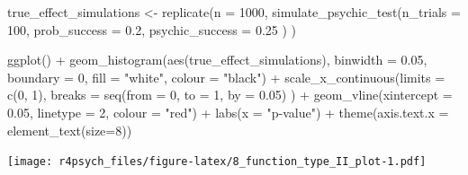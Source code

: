 \documentclass[
]{book}
\newenvironment{Shaded}{\begin{snugshade}}{\end{snugshade}}
\newcommand{\AttributeTok}[1]{\textcolor[rgb]{0.77,0.63,0.00}{#1}}
\newcommand{\DecValTok}[1]{\textcolor[rgb]{0.00,0.00,0.81}{#1}}
\newcommand{\FloatTok}[1]{\textcolor[rgb]{0.00,0.00,0.81}{#1}}
\newcommand{\FunctionTok}[1]{\textcolor[rgb]{0.00,0.00,0.00}{#1}}
\newcommand{\NormalTok}[1]{#1}
\newcommand{\OtherTok}[1]{\textcolor[rgb]{0.56,0.35,0.01}{#1}}
\newcommand{\SpecialCharTok}[1]{\textcolor[rgb]{0.00,0.00,0.00}{#1}}
\newcommand{\StringTok}[1]{\textcolor[rgb]{0.31,0.60,0.02}{#1}}
\begin{document}
\begin{Shaded}
\begin{Highlighting}[]
\NormalTok{true\_effect\_simulations }\OtherTok{\textless{}{-}} \FunctionTok{replicate}\NormalTok{(}\AttributeTok{n =} \DecValTok{1000}\NormalTok{, }
                         \FunctionTok{simulate\_psychic\_test}\NormalTok{(}\AttributeTok{n\_trials =} \DecValTok{100}\NormalTok{, }
                                               \AttributeTok{prob\_success =} \FloatTok{0.2}\NormalTok{,}
                                               \AttributeTok{psychic\_success =} \FloatTok{0.25}
\NormalTok{                                               )}
\NormalTok{                         )}
\end{Highlighting}
\end{Shaded}

\begin{Shaded}
\begin{Highlighting}[]
\FunctionTok{ggplot}\NormalTok{() }\SpecialCharTok{+} 
  \FunctionTok{geom\_histogram}\NormalTok{(}\FunctionTok{aes}\NormalTok{(true\_effect\_simulations),}
                 \AttributeTok{binwidth =} \FloatTok{0.05}\NormalTok{,}
                 \AttributeTok{boundary =} \DecValTok{0}\NormalTok{,}
                 \AttributeTok{fill =} \StringTok{"white"}\NormalTok{,}
                 \AttributeTok{colour =} \StringTok{"black"}\NormalTok{) }\SpecialCharTok{+}
  \FunctionTok{scale\_x\_continuous}\NormalTok{(}\AttributeTok{limits =} \FunctionTok{c}\NormalTok{(}\DecValTok{0}\NormalTok{, }\DecValTok{1}\NormalTok{), }
                     \AttributeTok{breaks =} \FunctionTok{seq}\NormalTok{(}\AttributeTok{from =} \DecValTok{0}\NormalTok{, }\AttributeTok{to =} \DecValTok{1}\NormalTok{, }\AttributeTok{by =} \FloatTok{0.05}\NormalTok{)}
\NormalTok{                     ) }\SpecialCharTok{+}
  \FunctionTok{geom\_vline}\NormalTok{(}\AttributeTok{xintercept =} \FloatTok{0.05}\NormalTok{, }\AttributeTok{linetype =} \DecValTok{2}\NormalTok{, }\AttributeTok{colour =} \StringTok{"red"}\NormalTok{) }\SpecialCharTok{+}
  \FunctionTok{labs}\NormalTok{(}\AttributeTok{x =} \StringTok{"p{-}value"}\NormalTok{) }\SpecialCharTok{+}
  \FunctionTok{theme}\NormalTok{(}\AttributeTok{axis.text.x =} \FunctionTok{element\_text}\NormalTok{(}\AttributeTok{size=}\DecValTok{8}\NormalTok{))}
\end{Highlighting}
\end{Shaded}

\texttt{[image: r4psych\_files/figure-latex/8\_function\_type\_II\_plot-1.pdf]}
\end{document}
